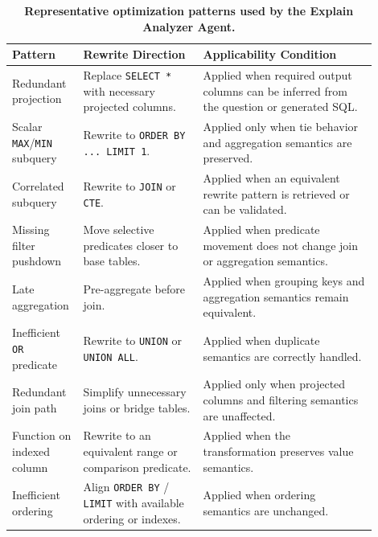 \begin{table}[t]
	\centering
	\vspace{-3mm}
	\caption{\textbf{Representative optimization patterns used by the Explain Analyzer Agent.}}
	\vspace{-2mm}
	\label{tab:explain-analyzer}
	\fontsize{6.4pt}{6.8pt}\selectfont
	\renewcommand{\arraystretch}{0.92}
	\begin{tabular}{p{0.14\linewidth}p{0.31\linewidth}p{0.45\linewidth}}
		\toprule
		\textbf{Pattern} & \textbf{Rewrite Direction} & \textbf{Applicability Condition} \\
		\midrule
		Redundant projection
		& Replace \texttt{SELECT *} with necessary projected columns.
		& Applied when required output columns can be inferred from the question or generated SQL. \\
		
		Scalar \texttt{MAX}/\texttt{MIN} subquery
		& Rewrite to \texttt{ORDER BY ... LIMIT 1}.
		& Applied only when tie behavior and aggregation semantics are preserved. \\
		
		Correlated subquery
		& Rewrite to \texttt{JOIN} or \texttt{CTE}.
		& Applied when an equivalent rewrite pattern is retrieved or can be validated. \\
		
		Missing filter pushdown
		& Move selective predicates closer to base tables.
		& Applied when predicate movement does not change join or aggregation semantics. \\
		
		Late aggregation
		& Pre-aggregate before join.
		& Applied when grouping keys and aggregation semantics remain equivalent. \\
		
		Inefficient \texttt{OR} predicate
		& Rewrite to \texttt{UNION} or \texttt{UNION ALL}.
		& Applied when duplicate semantics are correctly handled. \\
		
		Redundant join path
		& Simplify unnecessary joins or bridge tables.
		& Applied only when projected columns and filtering semantics are unaffected. \\
		
		Function on indexed column
		& Rewrite to an equivalent range or comparison predicate.
		& Applied when the transformation preserves value semantics. \\
		
		Inefficient ordering
		& Align \texttt{ORDER BY} / \texttt{LIMIT} with available ordering or indexes.
		& Applied when ordering semantics are unchanged. \\
		\bottomrule
	\end{tabular}
	\vspace{-5mm}
\end{table}

